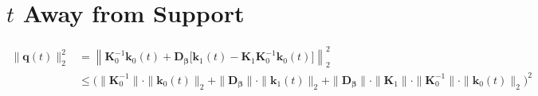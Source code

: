 \documentclass[11pt]{article}
\newcommand{\bbeta}{\bm \beta}
\newcommand{\bD}{\bm D}
\newcommand{\bK}{\bm K}
\newcommand{\bk}{\bm k}
\newcommand{\bq}{\bm q}
\begin{document}
\section{$t$ Away from Support}

\begin{align*}
  \|\bq(t)\|_2^2
  &= \left\|\bK_0^{-1}\bk_0(t) + \bD_{\bbeta}\bigg[\bk_1(t) - \bK_1\bK_0^{-1}\bk_0(t)\bigg]\right\|_2^2 \\
  &\leq \bigg(\|\bK_0^{-1}\|\cdot \|\bk_0(t)\|_2 + \|\bD_{\bbeta}\|\cdot \|\bk_1(t)\|_2 + \|\bD_{\bbeta}\|\cdot \|\bK_1\| \cdot \|\bK_0^{-1}\| \cdot \|\bk_0(t)\|_2\bigg)^2
\end{align*}



\end{document}
